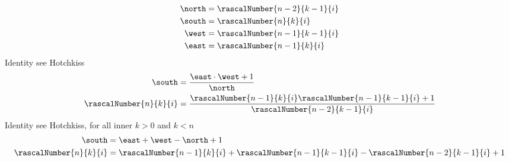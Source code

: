 \begin{align*}
    \north &= \rascalNumber{n-2}{k-1}{i} \\
    \south &= \rascalNumber{n}{k}{i} \\
    \west  &= \rascalNumber{n-1}{k-1}{i} \\
    \east  &= \rascalNumber{n-1}{k}{i}
\end{align*}
Identity see Hotchkiss
\begin{align}
    \south                  &= \frac{\east \cdot \west + 1}{\north} \\
    \rascalNumber{n}{k}{i}  &= \frac{\rascalNumber{n-1}{k}{i} \rascalNumber{n-1}{k-1}{i} +1}{\rascalNumber{n-2}{k-1}{i}}
\end{align}
Identity see Hotchkiss, for all inner $k > 0$ and $k < n$
\begin{align}
    \south                 &= \east + \west - \north  + 1 \\
    \rascalNumber{n}{k}{i} &= \rascalNumber{n-1}{k}{i} + \rascalNumber{n-1}{k-1}{i} - \rascalNumber{n-2}{k-1}{i} + 1
\end{align}

